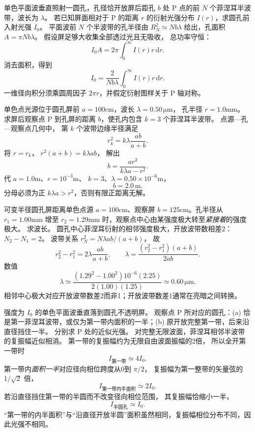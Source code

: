 单色平面波垂直照射一圆孔，孔径恰开放屏后距孔 $b$ 处 P 点的前 $N$ 个菲涅耳半波带，波长为 $\lambda$。
若已知屏面相对于 P 的距离 $r$ 的衍射光强分布 $I(r)$，求圆孔前入射光强 $I_0$。
\exsolution
平面波前 $N$ 个半波带的孔半径由
$R_N^2\simeq Nb\lambda$ 给出，孔面积
$A=\pi Nb\lambda$。
假设屏足够大收集全部透过光且无吸收，
总功率守恒：
\[
I_0A=2\pi\int_0^\infty I(r)r\,\mathrm dr.
\]
消去面积，得到
\[
\boxed{I_0=\frac2{Nb\lambda}
\int_0^\infty I(r)r\,\mathrm dr}.
\]
\excheck 一维径向积分须乘圆周因子 $2\pi r$，并假定衍射图样关于 P 轴对称。

单色点光源位于圆孔屏前
$a=100$cm，波长 $\lambda=0.50\,\mathrm{\mu m}$，
孔半径 $r=1.0$mm。
求屏后观察点 P 到孔屏的距离 $b$，使孔内包含
$k=3$ 个菲涅耳半波带。
\exsolution
点源—孔—观察点几何中，
第 $k$ 个波带边缘半径满足
\[
r_k^2=k\lambda\frac{ab}{a+b}.
\]
将 $r=r_k$，
$r^2(a+b)=k\lambda ab$，
解出
\[
\boxed{b=\frac{ar^2}{k\lambda a-r^2}}.
\]
代 $a=1.0$m、$r=10^{-3}$m、
$k=3$、$\lambda=0.50\times10^{-6}$m，
\[
\boxed{b=2.0\,\mathrm m}.
\]
\excheck 分母必须为正 $k\lambda a>r^2$，否则有限正距离无解。

可变半径圆孔屏距离单色点源
$a=100$cm、观察屏
$b=125$cm。孔半径从
$r_1=1.00$mm 增至
$r_2=1.29$mm 时，观察点中心由某强度极大转至\emph{紧接着}的强度极大。
求波长。
\exsolution
圆孔中心菲涅耳衍射的相邻强度极大，开放波带数相差2：
$N_2-N_1=2$。
波带关系
$r_N^2=N\lambda ab/(a+b)$，
故
\[
r_2^2-r_1^2=2\lambda\frac{ab}{a+b},
\qquad
\boxed{\lambda=
\frac{(r_2^2-r_1^2)(a+b)}{2ab}}.
\]
数值
\[
\boxed{\lambda\simeq
\frac{(1.29^2-1.00^2)10^{-6}(2.25)}
{2(1.00)(1.25)}
\simeq0.60\,\mathrm{\mu m}}.
\]
\excheck 相邻中心极大对应开放波带数差2而非1；开放波带数差1通常在亮暗之间转换。

强度为 $I_0$ 的单色平面波垂直落到圆孔不透明屏。
观察点 P 所对应的圆孔：(a) 恰是第一菲涅耳波带，或仅为第一带内面积的一半；(b) 原开放完整第一带，后来沿直径挡住一半。
分别求 P 处的近似光强。
\exsolution
对完整无限波面，菲涅耳相邻半波带的复振幅近似相消。
第一带的复振幅约为无限自由波面振幅的2倍，
所以全开第一带时
\[
\boxed{I_{\text{第一带}}\simeq4I_0}.
\]
第一带内\emph{面积一半}对应径向相位跨度从0到 $\pi/2$，
复振幅为第一整带的矢量弦的
$1/\sqrt2$ 倍，
\[
\boxed{I_{\text{第一带内半面积}}\simeq2I_0}.
\]
若沿直径挡住第一带的半圆而不改变径向相位范围，
其复振幅恰缩小一半，
\[
\boxed{I_{\text{半圆孔}}\simeq I_0}.
\]
\excheck “第一带的内半面积”与“沿直径开放半圆”面积虽然相同，复振幅相位分布不同，因此光强不相同。

